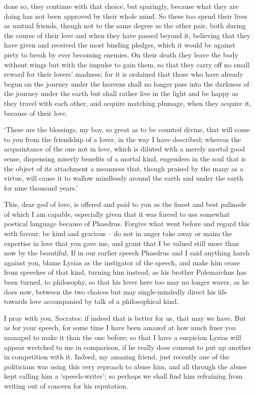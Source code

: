 done so, they continue with that choice, but sparingly, because what
they are doing has not been approved by their whole mind. So these too
spend their lives as mutual friends, though  not to the same
degree as the other pair, both during the course of their love and when
they have passed beyond it, believing that they have given and received
the most binding pledges, which it would be against piety to break by
ever becoming  enemies. On their death they leave the body
without wings but with the impulse to gain them, so that they carry off
no small reward for their lovers' madness; for it is ordained that those
who have already begun on the journey under the heavens shall no longer
pass into the darkness of the journey under the earth but shall rather
live in the light and be happy as they travel  with each other,
and acquire matching plumage, when they acquire it, because of their
love.

‘These are the blessings, my boy, so great as to be counted divine, that
will come to you from the friendship of a lover, in the way I have
described; whereas the acquaintance of the one  not in love,
which is diluted with a merely mortal good sense, dispensing miserly
benefits of a mortal kind, engenders in the soul that is the object of
its attachment a meanness that, though  praised by the many as
a virtue, will cause it to wallow mindlessly around the earth and under
the earth for nine thousand years.'

This, dear god of love, is offered and paid to you as the finest
and best palinode of which I am capable, especially given that
it was forced to use somewhat poetical language because of
Phaedrus. Forgive what went before and regard this with favour; be kind and gracious -- do not
in anger take away or maim the expertise in love that you gave
me, and grant that I be valued still more than now by the beautiful. If in our
earlier speech Phaedrus and I said anything harsh against you, blame
Lysias as the instigator of the speech, and make him cease from speeches
of that kind, turning him instead, as his brother
Polemarchus has been turned, to philosophy, so that his lover here too 
may no longer waver, as he does now, between the  two choices but may 
single-mindedly direct his life towards love accompanied by
talk of a philosophical kind.

I pray with you, Socrates: if indeed that is better 
for us, that may we have. But as for your speech, for some time I have
been amazed at how much finer you managed to make it than the one
before; so that I have a suspicion Lysias will appear wretched to me in
comparison, if he really does consent to put up another in competition
with it. Indeed, my amazing friend, just recently one of the politicians
was using this very  reproach to abuse him, and all through the
abuse kept calling him a ‘speech-writer'; so perhaps we shall find him
refraining from writing out of concern for his reputation.

